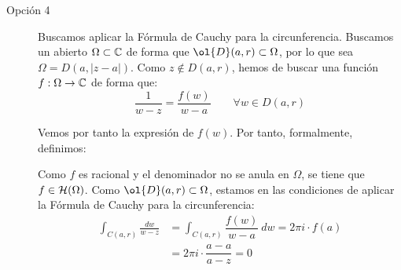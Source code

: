 \begin{ejercicio}
\begin{description}
        \item[Opción 4] Buscamos aplicar la Fórmula de Cauchy para la circunferencia. Buscamos un abierto $\Omega\subset \mathbb{C}$ de forma que $\ol{D}(a,r)\subset \Omega$, por lo que sea $\Omega=D(a,|z-a|)$. Como $z\notin D(a,r)$, hemos de buscar una función $f:\Omega\to \mathbb{C}$ de forma que:
        \begin{equation*}
            \dfrac{1}{w-z} = \dfrac{f(w)}{w-a}\qquad \forall w\in D(a,r)
        \end{equation*}

        Vemos por tanto la expresión de $f(w)$. Por tanto, formalmente, definimos:

        Como $f$ es racional y el denominador no se anula en $\Omega$, se tiene que $f\in \mathcal{H}(\Omega)$. Como $\ol{D}(a,r)\subset \Omega$, estamos en las condiciones de aplicar la Fórmula de Cauchy para la circunferencia:
        \begin{align*}
            \int_{C(a,r)} \frac{dw}{w-z} &= \int_{C(a,r)} \dfrac{f(w)}{w-a}\ dw
            = 2\pi i \cdot f(a)\\
            &= 2\pi i \cdot \dfrac{a-a}{a-z} = 0
        \end{align*}
    \end{description}
\end{ejercicio}

